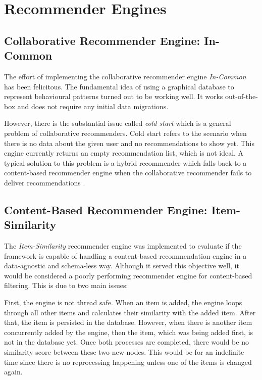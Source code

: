 \section{Recommender Engines}
\label{evaluation-engines}

\subsection{Collaborative Recommender Engine: In-Common}

The effort of implementing the collaborative recommender engine \emph{In-Common} has been felicitous. The fundamental idea of using a graphical database to represent behavioural patterns turned out to be working well. It works out-of-the-box and does not require any initial data migrations.

However, there is the substantial issue called \emph{cold start} which is a general problem of collaborative recommenders. Cold start refers to the scenario when there is no data about the given user and no recommendations to show yet. This engine currently returns an empty recommendation list, which is not ideal. A typical solution to this problem is a hybrid recommender which falls back to a content-based recommender engine when the collaborative recommender fails to deliver recommendations \cite{schein2002methods}.

\subsection{Content-Based Recommender Engine: Item-Similarity}

The \emph{Item-Similarity} recommender engine was implemented to evaluate if the framework is capable of handling a content-based recommendation engine in a data-agnostic and schema-less way. Although it served this objective well, it would be considered a poorly performing recommender engine for content-based filtering. This is due to two main issues:

First, the engine is not thread safe. When an item is added, the engine loops through all other items and calculates their similarity with the added item. After that, the item is persisted in the database. However, when there is another item concurrently added by the engine, then the item, which was being added first, is not in the database yet. Once both processes are completed, there would be no similarity score between these two new nodes. This would be for an indefinite time since there is no reprocessing happening unless one of the items is changed again.

